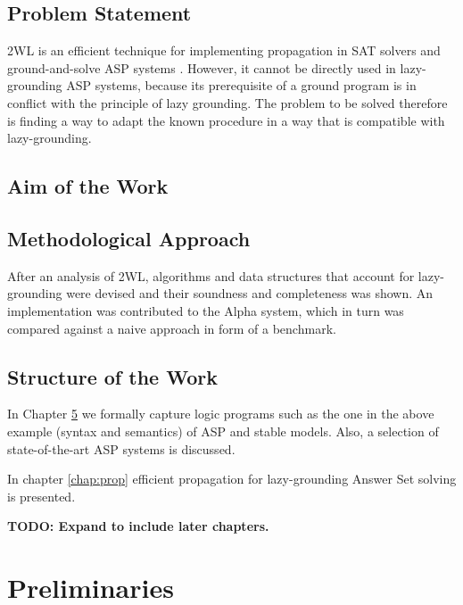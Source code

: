 \documentclass{vutinfth} %
\newcommand{\todo}[1]{{\color{red}\textbf{TODO: {#1}}}} %
\begin{document}
\section{Problem Statement}
\label{sec:problem}

2WL is an efficient technique for implementing propagation in SAT solvers \cite{effsat,questsat} and ground-and-solve ASP systems \cite[Sec.~5.3]{clasp}. However, it cannot be directly used in lazy-grounding ASP systems, because its prerequisite of a ground program is in conflict with the principle of lazy grounding. The problem to be solved therefore is finding a way to adapt the known procedure in a way that is compatible with lazy-grounding.

\section{Aim of the Work}
\label{sec:aim}

\section{Methodological Approach}

After an analysis of 2WL, algorithms and data structures that account for lazy-grounding were devised and their soundness and completeness was shown. An implementation was contributed to the Alpha system, which in turn was compared against a naive approach in form of a benchmark.

\section{Structure of the Work} %

In Chapter \ref{chap:prelim} we formally capture logic programs such as the one in the above example (syntax and semantics) of ASP and stable models. Also, a selection of state-of-the-art ASP systems is discussed.

In chapter \ref{chap:prop} efficient propagation for lazy-grounding Answer Set solving is presented.

\todo{Expand to include later chapters.}

\chapter{Preliminaries}
\label{chap:prelim}
\end{document}
